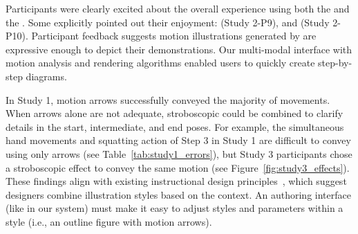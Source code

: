%
Participants were clearly excited about the overall experience using both the \phaseI{} and the \phaseII{}.
%
Some explicitly pointed out their enjoyment:
 (Study 2-P9), and
 (Study 2-P10).
%
Participant feedback suggests motion illustrations generated by \systemname{} are expressive enough to depict their demonstrations. Our multi-modal interface with motion analysis and rendering algorithms enabled users to quickly create step-by-step diagrams.




In Study 1, motion arrows successfully conveyed the majority of movements. When arrows alone are not adequate, stroboscopic could be combined to clarify details in the start, intermediate, and end poses. For example, the simultaneous hand movements and squatting action of Step 3 in Study 1 are difficult to convey using only arrows (see Table~\ref{tab:study1_errors}), but Study 3 participants chose a stroboscopic effect to convey the same motion (see Figure~\ref{fig:study3_effects}).
%
These findings align with existing instructional design principles~\cite{mijksenaar1999open}, which suggest designers combine illustration styles based on the context. An authoring interface (like \phaseII{} in our system) must make it easy to adjust styles and parameters within a style (i.e., an outline figure with motion arrows).

